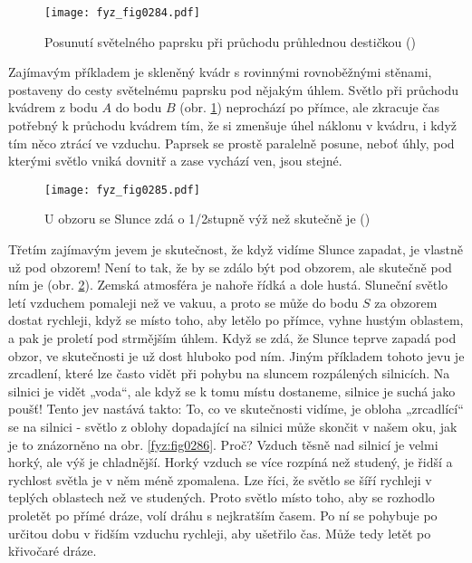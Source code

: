     \begin{figure}[ht!] %
      \centering
      \texttt{[image: fyz\_fig0284.pdf]}
      \caption{Posunutí světelného paprsku při průchodu průhlednou destičkou
               (\cite[s.~350]{Feynman01})}
      \label{fyz:fig0284}
    \end{figure}

    Zajímavým příkladem je skleněný kvádr s rovinnými rovnoběžnými stěnami, postaveny do cesty 
    světelnému paprsku pod nějakým úhlem. Světlo při průchodu kvádrem z bodu \(A\) do bodu \(B\) 
    (obr. \ref{fyz:fig0284}) neprochází po přímce, ale zkracuje čas potřebný k průchodu kvádrem tím, 
    že si zmenšuje úhel náklonu v kvádru, i když tím něco ztrácí ve vzduchu. Paprsek se prostě 
    paralelně posune, neboť úhly, pod kterými světlo vniká dovnitř a zase vychází ven, jsou stejné.
    
    \begin{figure}[ht!] %
      \centering
      \texttt{[image: fyz\_fig0285.pdf]}
      \caption{U obzoru se Slunce zdá o 1/2stupně výž než skutečně je 
               (\cite[s.~350]{Feynman01})}
      \label{fyz:fig0285}
    \end{figure}
    
    Třetím zajímavým jevem je skutečnost, že když vidíme Slunce zapadat, je vlastně už pod obzorem! 
    Není to tak, že by se zdálo být pod obzorem, ale skutečně pod ním je (obr. \ref{fyz:fig0285}). 
    Zemská atmosféra je nahoře řídká a dole hustá. Sluneční světlo letí vzduchem pomaleji než ve 
    vakuu, a proto se může do bodu \(S\) za obzorem dostat rychleji, když se místo toho, aby letělo 
    po přímce, vyhne hustým oblastem, a pak je proletí pod strmějším úhlem. Když se zdá, že Slunce 
    teprve zapadá pod obzor, ve skutečnosti je už dost hluboko pod ním. Jiným příkladem tohoto jevu 
    je zrcadlení, které lze často vidět při pohybu na sluncem rozpálených silnicích. Na silnici je 
    vidět „voda“, ale když se k tomu místu dostaneme, silnice je suchá jako poušť! Tento jev 
    nastává takto: To, co ve skutečnosti vidíme, je obloha „zrcadlící“ se na silnici - světlo z 
    oblohy dopadající na silnici může skončit v našem oku, jak je to znázorněno na obr. 
    \ref{fyz:fig0286}. Proč? Vzduch těsně nad silnicí je velmi horký, ale výš je chladnější. Horký 
    vzduch se více rozpíná než studený, je řidší a rychlost světla je v něm méně zpomalena. Lze 
    říci, že světlo se šíří rychleji v teplých oblastech než ve studených. Proto světlo místo toho, 
    aby se rozhodlo proletět po přímé dráze, volí dráhu s nejkratším časem. Po ní se pohybuje po 
    určitou dobu v řidším vzduchu rychleji, aby ušetřilo čas. Může tedy letět po křivočaré dráze.
    
